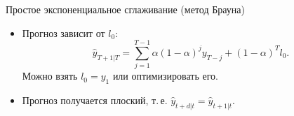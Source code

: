 \documentclass[9pt,pdf,utf8,hyperref={unicode},aspectratio=169]{beamer}
\begin{document}
\begin{frame}{Простое экспоненциальное сглаживание (метод Брауна)}
{\begin{itemize}
			\item Прогноз зависит от $l_0$:
			$$\hat{y}_{T+1|T} = \sum_{j=1}^{T-1}\alpha\left(1-\alpha\right)^j y_{T-j} + \left(1-\alpha\right)^T l_0.$$
			Можно взять $l_0=y_1$ или оптимизировать его.
			\item Прогноз получается плоский, т.\,е. $\hat{y}_{t+d|t} = \hat{y}_{t+1|t}$.
		\end{itemize}
	}	
	
\end{frame}
\end{document}
